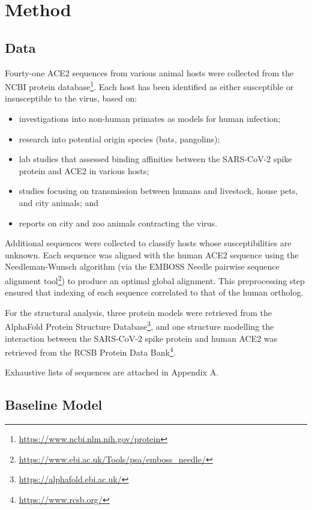\section{Method}

\subsection{Data}
Fourty-one ACE2 sequences from various animal hosts were collected from the NCBI protein database\footnote{\url{https://www.ncbi.nlm.nih.gov/protein}}. Each host has been identified as either susceptible or insusceptible to the virus, based on:
\begin{itemize}
    \setlength\itemsep{0em}
    \item investigations into non-human primates as models for human
    infection;
    \item research into potential origin species (bats, pangolins);
    \item lab studies that assessed binding affinities between the SARS-CoV-2 spike protein and ACE2 in various hosts;
    \item studies focusing on transmission between humans and livestock, house pets, and city animals; and
    \item reports on city and zoo animals contracting the virus.
\end{itemize}

Additional sequences were collected to classify hosts whose susceptibilities are unknown. Each sequence was aligned with the human ACE2 sequence using the Needleman-Wunsch algorithm (via the EMBOSS Needle pairwise sequence alignment tool\footnote{\url{https://www.ebi.ac.uk/Tools/psa/emboss_needle/}}) to produce an optimal global alignment. This preprocessing step ensured that indexing of each sequence correlated to that of the human ortholog.

For the structural analysis, three protein models were retrieved from the AlphaFold Protein Structure Database\footnote{\url{https://alphafold.ebi.ac.uk/}}, and one structure modelling the interaction between the SARS-CoV-2 spike protein and human ACE2 was retrieved from the RCSB Protein Data Bank\footnote{\url{https://www.rcsb.org/}}.

Exhaustive lists of sequences are attached in Appendix A.

\subsection{Baseline Model}

